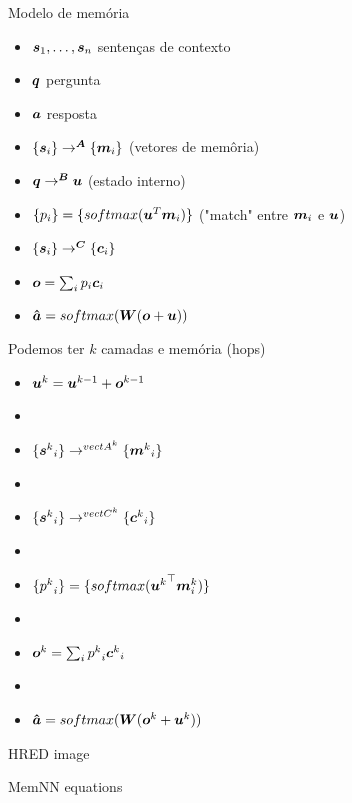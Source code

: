 \documentclass[10pt]{beamer}
\begin{document}
\begin{frame}{Modelo de memória}
\begin{itemize}
\item $\bm{s}_1, \dots, \bm{s}_n$ sentenças de contexto
\item $\bm{q}$ pergunta
\item $\bm{a}$ resposta
\item $\{ \bm{s}_i\} \rightarrow^{\bm{A}} \{ \bm{m}_i\}$  (vetores de memôria)
\item $\bm{q} \rightarrow^{\bm{B}} \bm{u}$  (estado interno)
\item $\{ p_i\} = \{ softmax(\bm{u}^{T}\bm{m}_i)\}$  ("match" entre $\bm{m}_i$ e $\bm{u}$)
\item $\{ \bm{s}_i\} \rightarrow^{\bm{C}} \{ \bm{c}_i\}$
\item $\bm{o}= \sum_{i} p_i \bm{c}_i$
\item $\bm{\hat{a}}= softmax(\bm{W}(\bm{o} + \bm{u}))$
\end{itemize}
\end{frame}


\begin{frame}{ Podemos ter $k$ camadas e memória (hops)}
\begin{itemize}
\item $\bm{u}^{k} = \bm{u}^{k-1} + \bm{o}^{k-1}$
\item[]
\item $\{ {\bm{s}^{k}}_i\} \rightarrow^{{vect{A}^{k}}} \{ {\bm{m}^{k}}_i\}$
\item[]
\item $\{ {\bm{s}^{k}}_i\} \rightarrow^{{vect{C}^{k}}} \{ {\bm{c}^{k}}_i\}$
\item[]
\item $\{{p^{k}}_i\} = \{ softmax({\bm{u}^{k}}^{\top} {\bm{m}^{k}_{i}})\}$
\item[]
\item $\bm{o}^{k}= \sum_{i} {p^{k}}_i {\bm{c}^{k}}_i$
\item[]
\item $\bm{\hat{a}}= softmax(\bm{W}(\bm{o}^{k} + \bm{u}^{k}))$
\end{itemize}
\end{frame}

\begin{frame}{HRED}
image
\end{frame}


\begin{frame}{MemNN}
equations
\end{frame}
\end{document}
